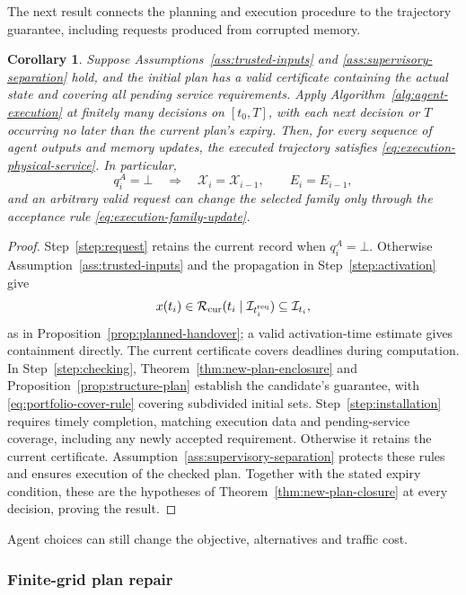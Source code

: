 \documentclass[preprint,12pt]{elsarticle}
\theoremstyle{definition}
\theoremstyle{plain}
\newtheorem{corollary}{Corollary}
\theoremstyle{definition}
\theoremstyle{plain}
\begin{document}
The next result connects the planning and execution procedure to the trajectory
guarantee, including requests produced from corrupted memory.

\begin{corollary}
\label{cor:agent-independent-execution}
Suppose Assumptions~\ref{ass:trusted-inputs} and
\ref{ass:supervisory-separation} hold, and the initial plan has a valid
certificate containing the actual state and covering all pending service
requirements. Apply Algorithm~\ref{alg:agent-execution} at finitely many
decisions on $[t_0,T]$, with each next decision or $T$ occurring no later
than the current plan's expiry. Then, for every sequence of agent outputs
and memory updates, the executed trajectory satisfies
\eqref{eq:execution-physical-service}. In particular,
\[
q_i^A=\bot
\quad\Longrightarrow\quad
\mathcal X_i=\mathcal X_{i-1},\qquad E_i=E_{i-1},
\]
and an arbitrary valid request can change the selected family only
through the acceptance rule \eqref{eq:execution-family-update}.
\end{corollary}

\begin{proof}
Step~\ref{step:request} retains the current record when $q_i^A=\bot$.
Otherwise Assumption~\ref{ass:trusted-inputs} and the propagation in
Step~\ref{step:activation} give
\[
x(t_i)\in\mathcal R_{\rm cur}(t_i\mid\mathcal I_{t_i^{\rm req}})
\subseteq\mathcal I_{t_i},
\]
as in Proposition~\ref{prop:planned-handover}; a valid activation-time
estimate gives containment directly. The current certificate covers
deadlines during computation. In Step~\ref{step:checking},
Theorem~\ref{thm:new-plan-enclosure} and Proposition~\ref{prop:structure-plan}
establish the candidate's guarantee, with \eqref{eq:portfolio-cover-rule}
covering subdivided initial sets. Step~\ref{step:installation} requires
timely completion, matching execution data and pending-service coverage,
including any newly accepted requirement. Otherwise it retains the
current certificate. Assumption~\ref{ass:supervisory-separation} protects
these rules and ensures execution of the checked plan. Together with
the stated expiry condition, these are the hypotheses of
Theorem~\ref{thm:new-plan-closure} at every decision, proving the result.
\end{proof}

Agent choices can still change the objective, alternatives and traffic cost.

\subsubsection{Finite-grid plan repair}
\label{sec:predictive-repair}
\end{document}
